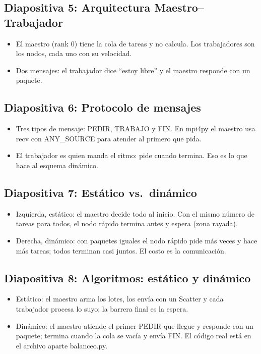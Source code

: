 \documentclass[11pt,a4paper]{article}
\begin{document}
\subsection*{Diapositiva 5: Arquitectura Maestro–Trabajador}
\begin{itemize}
  \item El maestro (rank 0) tiene la cola de tareas y no calcula. Los trabajadores son los nodos, cada uno con su velocidad.
  \item Dos mensajes: el trabajador dice ``estoy libre'' y el maestro responde con un paquete.
\end{itemize}

\subsection*{Diapositiva 6: Protocolo de mensajes}
\begin{itemize}
  \item Tres tipos de mensaje: PEDIR, TRABAJO y FIN. En mpi4py el maestro usa recv con ANY\_SOURCE para atender al primero que pida.
  \item El trabajador es quien manda el ritmo: pide cuando termina. Eso es lo que hace al esquema dinámico.
\end{itemize}

\subsection*{Diapositiva 7: Estático vs.\ dinámico}
\begin{itemize}
  \item Izquierda, estático: el maestro decide todo al inicio. Con el mismo número de tareas para todos, el nodo rápido termina antes y espera (zona rayada).
  \item Derecha, dinámico: con paquetes iguales el nodo rápido pide más veces y hace más tareas; todos terminan casi juntos. El costo es la comunicación.
\end{itemize}

\subsection*{Diapositiva 8: Algoritmos: estático y dinámico}
\begin{itemize}
  \item Estático: el maestro arma los lotes, los envía con un Scatter y cada trabajador procesa lo suyo; la barrera final es la espera.
  \item Dinámico: el maestro atiende el primer PEDIR que llegue y responde con un paquete; termina cuando la cola se vacía y envía FIN. El código real está en el archivo aparte balanceo.py.
\end{itemize}
\end{document}
